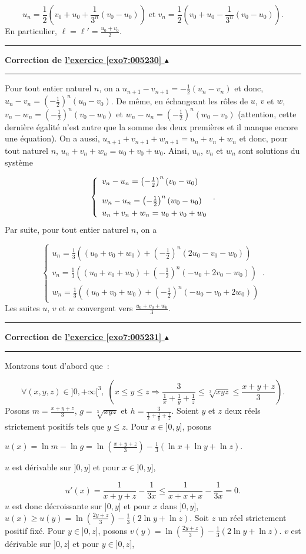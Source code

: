 \documentclass[11pt,a4paper]{article}
\newcounter{exo}
\newcommand{\correction}[1]{\hypertarget{cor7:#1}{}\label{cor7:#1}{\bf Correction de \hyperlink{exo7:#1}{l'exercice \ref{exo7:#1} $\blacktriangle$}}\vspace{1mm}\hrule\vspace{1mm}}
\newcommand{\fincorrection}{\vspace{1mm}\hrule\vspace*{7mm}}
\begin{document}
$$u_n=\frac{1}{2}\left(v_0+u_0+\frac{1}{3^n}(v_0-u_0)\right)\;\mbox{et}\;v_n=\frac{1}{2}\left(v_0+u_0-\frac{1}{3^n}(v_0-u_0)\right).$$
En particulier, $\ell=\ell'=\frac{u_0+v_0}{2}$.
\fincorrection
\correction{005230}
Pour tout entier naturel $n$, on a $u_{n+1}-v_{n+1}=-\frac{1}{2}(u_n-v_n)$  et donc, $u_n-v_n=\left(-\frac{1}{2}\right)^n(u_0-v_0)$.
De même, en échangeant les rôles de $u$, $v$ et $w$, $v_n-w_n=\left(-\frac{1}{2}\right)^n(v_0-w_0)$ et $w_n-u_n=\left(-\frac{1}{2}\right)^n(w_0-v_0)$ (attention, cette dernière égalité n'est autre que la somme des deux premières et il manque encore une équation).
On a aussi, $u_{n+1}+v_{n+1}+w_{n+1}=u_n+v_n+w_n$ et donc, pour tout naturel $n$, $u_n+v_n+w_n=u_0+v_0+w_0$.
Ainsi, $u_n$, $v_n$ et $w_n$ sont solutions du système

$$\left\{
\begin{array}{l}
v_n-u_n=\left(-\frac{1}{2}\right)^n(v_0-u_0)\\
\rule{0mm}{7mm}w_n-u_n=\left(-\frac{1}{2}\right)^n(w_0-u_0)\\
\rule{0mm}{4mm}u_n+v_n+w_n=u_0+v_0+w_0
\end{array}
\right..$$
Par suite, pour tout entier naturel $n$, on a

$$\left\{
\begin{array}{l}
u_n=\frac{1}{3}\left((u_0+v_0+w_0)+\left(-\frac{1}{2}\right)^n(2u_0-v_0-w_0)\right)\\
v_n=\frac{1}{3}\left((u_0+v_0+w_0)+\left(-\frac{1}{2}\right)^n(-u_0+2v_0-w_0)\right)\\
w_n=\frac{1}{3}\left((u_0+v_0+w_0)+\left(-\frac{1}{2}\right)^n(-u_0-v_0+2w_0)\right)
\end{array}
\right..$$
Les suites $u$, $v$ et $w$ convergent vers $\frac{u_0+v_0+w_0}{3}$.
\fincorrection
\correction{005231}
Montrons tout d'abord que~:

$$\forall(x,y,z)\in]0,+\infty[^3,\;(x\leq y\leq z\Rightarrow\frac{3}{\frac{1}{x}+\frac{1}{y}+\frac{1}{z}}\leq\sqrt[3]{xyz}\leq\frac{x+y+z}{3}).$$
Posons $m=\frac{x+y+z}{3}$, $g=\sqrt[3]{xyz}$ et $h=\frac{3}{\frac{1}{x}+\frac{1}{y}+\frac{1}{z}}$.
Soient $y$ et $z$ deux réels strictement positifs tels que $y\leq z$. Pour $x\in]0,y]$, posons

\begin{center}
$u(x)=\ln m-\ln g=\ln\left(\frac{x+y+z}{3}\right)-\frac{1}{3}\left(\ln x+\ln y+\ln z\right)$.
\end{center}
$u$ est dérivable sur $]0,y]$ et pour $x\in]0,y]$, 

$$u'(x)=\frac{1}{x+y+z}-\frac{1}{3x}\leq\frac{1}{x+x+x}-\frac{1}{3x}=0.$$
$u$ est donc décroissante sur $]0,y]$ et pour $x$ dans $]0,y]$, $u(x)\geq u(y)=\ln\left(\frac{2y+z}{3}\right)-\frac{1}{3}(2\ln y+\ln z)$.
Soit $z$ un réel strictement positif fixé. Pour $y\in]0,z]$, posons $v(y)=\ln\left(\frac{2y+z}{3}\right)-\frac{1}{3}(2\ln y+\ln z)$. $v$ est dérivable sur $]0,z]$ et pour $y\in]0,z]$, 
\end{document}
